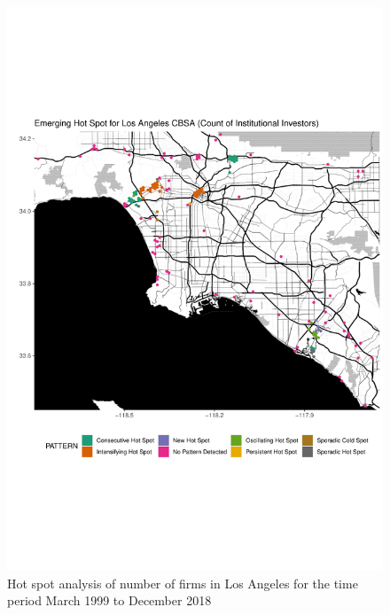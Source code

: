 \begin{figure}
	\centering
	\includegraphics[width=1\linewidth]{Figures/ChapterIV/LA_Count_EH}
	\caption[Hot Spot Analysis of Number of Firms in Los Angeles CBSA 1999-2018]{Hot spot analysis of number of firms in Los Angeles for the time period March 1999 to December 2018}
	\label{fig:LAcounthotspot}
\end{figure}

